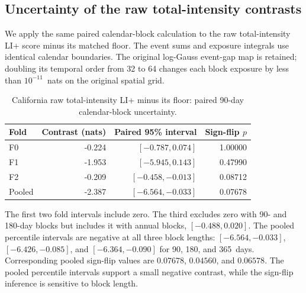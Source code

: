 \subsection{Uncertainty of the raw total-intensity contrasts}
We apply the same paired calendar-block calculation to the raw total-intensity
LI+ score minus its matched floor. The event sums and exposure integrals use
identical calendar boundaries. The original log-Gauss event-gap map is retained;
doubling its temporal order from 32 to 64 changes each block exposure by less
than $10^{-11}$~nats on the original spatial grid.

\begin{table}[htbp]
\centering
\begin{tabular}{lrrr}
\toprule
Fold & Contrast (nats) & Paired 95\% interval & Sign-flip $p$ \\
\midrule
F0 & -0.224 & $[-0.787,0.074]$ & 1.00000 \\
F1 & -1.953 & $[-5.945,0.143]$ & 0.47990 \\
F2 & -0.209 & $[-0.458,-0.013]$ & 0.08712 \\
\midrule
Pooled & -2.387 & $[-6.564,-0.033]$ & 0.07678 \\
\bottomrule
\end{tabular}
\caption{California raw total-intensity LI+ minus its floor: paired 90-day calendar-block uncertainty.}
\label{tab:ca_li_floor_uncertainty}
\end{table}

The first two fold intervals include zero. The third excludes zero with 90- and 180-day blocks but includes it with annual blocks, $[-0.488,0.020]$. The pooled percentile intervals are negative at all three block lengths: $[-6.564,-0.033]$, $[-6.426,-0.085]$, and $[-6.364,-0.090]$ for 90, 180, and 365~days. Corresponding pooled sign-flip values are $0.07678$, $0.04560$, and $0.06578$. The pooled percentile intervals support a small negative contrast, while the sign-flip inference is sensitive to block length.
